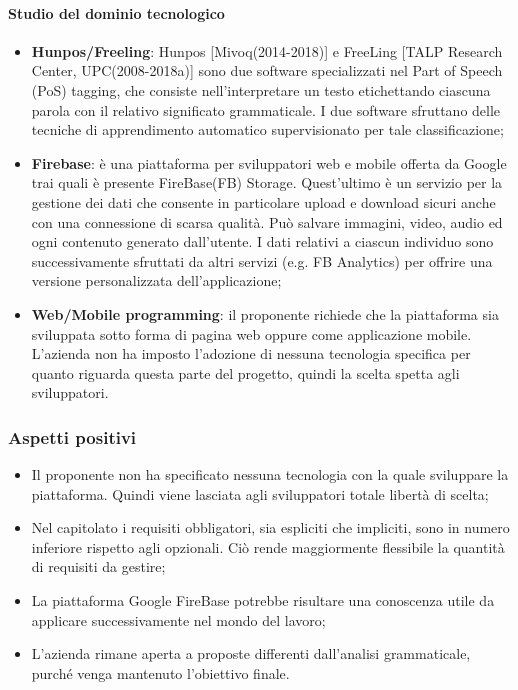 \paragraph{Studio del dominio tecnologico}
\begin{itemize}
	\item \textbf{Hunpos/Freeling}: Hunpos [Mivoq(2014-2018)] e FreeLing [TALP Research Center, UPC(2008-2018a)] sono due software specializzati nel Part of Speech (PoS) tagging, che consiste nell'interpretare un testo etichettando ciascuna parola con il relativo significato grammaticale. I due software sfruttano delle tecniche di apprendimento automatico supervisionato per tale classificazione;
	\item \textbf{Firebase}: è una piattaforma per sviluppatori web e mobile offerta da Google trai quali è presente FireBase(FB) Storage. Quest'ultimo è un servizio per la gestione dei dati che consente in particolare upload e download sicuri anche con una connessione di scarsa qualità. Può salvare immagini, video, audio ed ogni contenuto generato dall'utente. I dati relativi a ciascun individuo sono successivamente sfruttati da altri servizi (e.g. FB Analytics) per offrire una versione personalizzata dell'applicazione;
	\item \textbf{Web/Mobile programming}: il proponente richiede che la piattaforma sia sviluppata sotto forma di pagina web oppure come applicazione mobile. L'azienda non ha imposto l'adozione di nessuna tecnologia specifica per quanto riguarda questa parte del progetto, quindi la scelta spetta agli sviluppatori.		
\end{itemize}
\subsubsection{Aspetti positivi}
\begin{itemize}
	\item Il proponente non ha specificato nessuna tecnologia con la quale sviluppare la piattaforma. Quindi viene lasciata agli sviluppatori totale libertà di scelta;
	\item Nel capitolato i requisiti obbligatori, sia espliciti che impliciti, sono in numero inferiore rispetto agli opzionali. Ciò rende maggiormente flessibile la quantità di requisiti da gestire;
	\item La piattaforma Google FireBase potrebbe risultare una conoscenza utile da applicare successivamente nel mondo del lavoro;
	\item L'azienda rimane aperta a proposte differenti dall'analisi grammaticale, purché venga mantenuto l'obiettivo finale.
	
\end{itemize}
